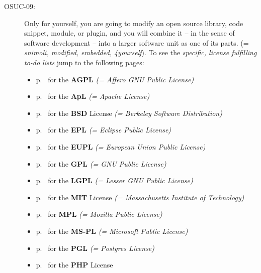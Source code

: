 \begin{description}
\item[OSUC-09:]\label{OSUC-09-DEF} Only for yourself, you are going to modify an
open source library, code snippet, module, or plugin, and you will combine it
-- in the sense of software development -- into a larger software unit as one of
its parts. (= \textit{snimoli, modified, embedded, 4yourself}). 
To see the \textit{specific, license fulfilling to-do lists} jump to the
following pages:
  \begin{itemize}
    \item p.\ \pageref{OSUC-09-AGPL} for the \textbf{AGPL}
      \textit{(= Affero GNU Public License)} 
    \item p.\ \pageref{OSUC-09-Apache20} for the \textbf{ApL}
      \textit{(= Apache License)}
    \item p.\ \pageref{OSUC-09-BSD} for the \textbf{BSD} License
      \textit{(= Berkeley Software Distribution)}
    \item p.\ \pageref{OSUC-09-EPL} for the \textbf{EPL}
      \textit{(= Eclipse Public License)}     
    \item p.\ \pageref{OSUC-09-EUPL} for the \textbf{EUPL}
      \textit{(= European Union Public License)} 
    \item p.\ \pageref{OSUC-09-GPL} for the \textbf{GPL}
       \textit{(= GNU Public License)} 
    \item p.\ \pageref{OSUC-09-LGPL} for the \textbf{LGPL}
      \textit{(= Lesser GNU Public License)}           
    \item p.\ \pageref{OSUC-09-MIT} for the \textbf{MIT} License
       \textit{(= Massachusetts Institute of Technology)} 
    \item p.\ \pageref{OSUC-09-MPL} for \textbf{MPL}
      \textit{(= Mozilla Public License)}     
    \item p.\ \pageref{OSUC-09-MS-PL} for the \textbf{MS-PL}
      \textit{(= Microsoft Public License)} 
    \item p.\ \pageref{OSUC-09-PGL} for the \textbf{PGL}
      \textit{(= Postgres License)} 
    \item p.\ \pageref{OSUC-09-PHP} for the \textbf{PHP} License 
  \end{itemize}



\end{description}
